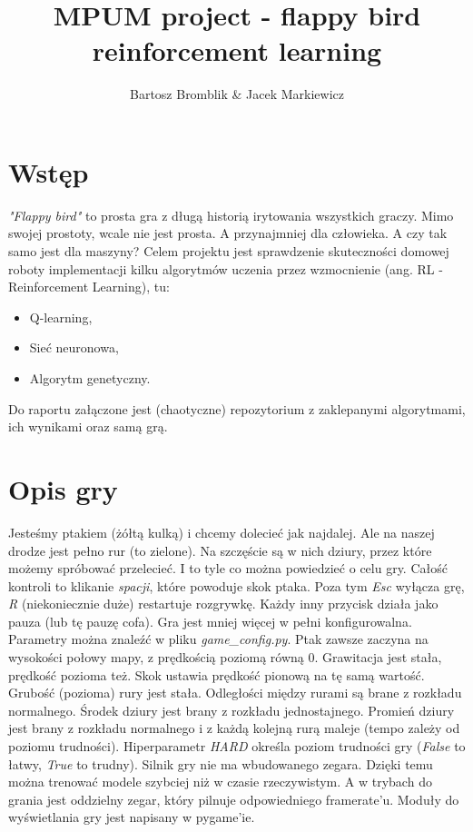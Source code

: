 \documentclass[12pt, A4]{article}
\title{MPUM project - flappy bird reinforcement learning}
\author{Bartosz Bromblik \& Jacek Markiewicz}
\date{}
\begin{document}
\maketitle


\section{Wstęp}
\textit{"Flappy bird"} to prosta gra z długą historią irytowania wszystkich graczy. Mimo swojej prostoty, wcale nie jest prosta. A przynajmniej dla człowieka. A czy tak samo jest dla maszyny?
\newline
Celem projektu jest sprawdzenie skuteczności domowej roboty implementacji kilku algorytmów uczenia przez wzmocnienie (ang. RL - Reinforcement Learning), tu:
\begin{itemize}
	\item Q-learning,
	\item Sieć neuronowa,
	\item Algorytm genetyczny.
\end{itemize}
Do raportu załączone jest (chaotyczne) repozytorium z zaklepanymi algorytmami, ich wynikami oraz samą grą.


\section{Opis gry}
Jesteśmy ptakiem (żółtą kulką) i chcemy dolecieć jak najdalej. Ale na naszej drodze jest pełno rur (to zielone). Na szczęście są w nich dziury, przez które możemy spróbować przelecieć. I to tyle co można powiedzieć o celu gry.
\newline
Całość kontroli to klikanie \textit{spacji}, które powoduje skok ptaka. Poza tym \textit{Esc} wyłącza grę, \textit{R} (niekoniecznie duże) restartuje rozgrywkę. Każdy inny przycisk działa jako pauza (lub tę pauzę cofa).
\newline\newline
Gra jest mniej więcej w pełni konfigurowalna. Parametry można znaleźć w pliku \textit{game\_config.py}.
\newline
Ptak zawsze zaczyna na wysokości połowy mapy, z prędkością poziomą równą $0$. Grawitacja jest stała, prędkość pozioma też. Skok ustawia prędkość pionową na tę samą wartość.
\newline
Grubość (pozioma) rury jest stała. Odległości między rurami są brane z rozkładu normalnego. Środek dziury jest brany z rozkładu jednostajnego. Promień dziury jest brany z rozkładu normalnego i z każdą kolejną rurą maleje (tempo zależy od poziomu trudności).
\newline\newline
Hiperparametr \textit{HARD} określa poziom trudności gry (\textit{False} to łatwy, \textit{True} to trudny). 
\newline\newline
Silnik gry nie ma wbudowanego zegara. Dzięki temu można trenować modele szybciej niż w czasie rzeczywistym. A w trybach do grania jest oddzielny zegar, który pilnuje odpowiedniego framerate'u.
\newline
Moduły do wyświetlania gry jest napisany w pygame'ie.
\end{document}

